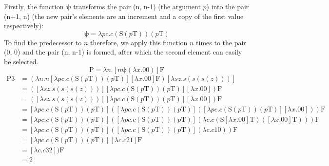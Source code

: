 \documentclass[Master.tex]{subfiles}
\begin{document}
Firstly, the function $\bm{\psi}$ transforms the pair (n, n-1) (the argument $p$) into the pair (n+1, n) (the new pair's elements are an increment and a copy of the first value respectively):
\cite{rojas2015lambdatutorial}
\begin{equation*}
\bm{\psi} = \lambda pc.c(\bm{\mathrm{S}}(p\bm{\mathrm{T}}))(p\bm{\mathrm{T}})
\end{equation*}
To find the predecessor to $n$ therefore, we apply this function $n$ times to the pair (0, 0) and the pair (n, n-1) is formed, after which the second element can easily be selected.
\cite{rojas2015lambdatutorial}
\begin{equation*}
\bm{\mathrm{P}} = \lambda n.[n \bm{\psi} (\lambda x.\bm{\mathrm{00}})] \bm{\mathrm{F}} 
\end{equation*}
\begin{equation*}
\begin{aligned}
\bm{\mathrm{P3}} &= (\lambda n.n [\lambda pc.c(\bm{\mathrm{S}}(p\bm{\mathrm{T}}))(p\bm{\mathrm{T}})] [\lambda x.\bm{\mathrm{00}}] \bm{\mathrm{F}}) [\lambda sz.s(s(s(z)))]\\
&= ([\lambda sz.s(s(s(z)))] [\lambda pc.c(\bm{\mathrm{S}}(p\bm{\mathrm{T}}))(p\bm{\mathrm{T}})] [\lambda x.\bm{\mathrm{00}}]) \bm{\mathrm{F}}\\
&= ([\lambda sz.s(s(s(z)))] [\lambda pc.c(\bm{\mathrm{S}}(p\bm{\mathrm{T}}))(p\bm{\mathrm{T}})] [\lambda x.\bm{\mathrm{00}}]) \bm{\mathrm{F}}\\
&= [\lambda pc.c(\bm{\mathrm{S}}(p\bm{\mathrm{T}}))(p\bm{\mathrm{T}})]([\lambda pc.c(\bm{\mathrm{S}}(p\bm{\mathrm{T}}))(p\bm{\mathrm{T}})]([\lambda pc.c(\bm{\mathrm{S}}(p\bm{\mathrm{T}}))(p\bm{\mathrm{T}})][\lambda x.\bm{\mathrm{00}}]))\bm{\mathrm{F}}\\
&= [\lambda pc.c(\bm{\mathrm{S}}(p\bm{\mathrm{T}}))(p\bm{\mathrm{T}})]([\lambda pc.c(\bm{\mathrm{S}}(p\bm{\mathrm{T}}))(p\bm{\mathrm{T}})](\lambda c.c(\bm{\mathrm{S}}[\lambda x.\bm{\mathrm{00}}]\bm{\mathrm{T}})([\lambda x.\bm{\mathrm{00}}]\bm{\mathrm{T}})))\bm{\mathrm{F}}\\
&= [\lambda pc.c(\bm{\mathrm{S}}(p\bm{\mathrm{T}}))(p\bm{\mathrm{T}})]([\lambda pc.c(\bm{\mathrm{S}}(p\bm{\mathrm{T}}))(p\bm{\mathrm{T}})](\lambda c.c\bm{\mathrm{10}}))\bm{\mathrm{F}}\\
&= [\lambda pc.c(\bm{\mathrm{S}}(p\bm{\mathrm{T}}))(p\bm{\mathrm{T}})][\lambda c.c\bm{\mathrm{21}}]\bm{\mathrm{F}}\\
&= [\lambda c.c\bm{\mathrm{32}} ])\bm{\mathrm{F}}\\
&= \bm{\mathrm{2}}
\end{aligned}
\end{equation*}
\end{document}
